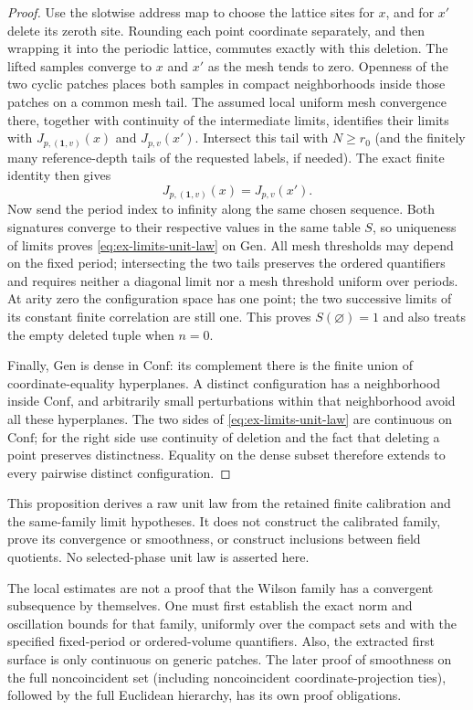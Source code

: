 \begin{proof}
Use the slotwise address map to choose the lattice sites for $x$, and
for $x'$ delete its zeroth site. Rounding each point coordinate separately,
and then wrapping it into the periodic lattice, commutes exactly with
this deletion. The lifted samples converge to $x$ and $x'$ as the mesh
tends to zero. Openness of the two cyclic patches places both samples in
compact neighborhoods inside those patches on a common mesh tail.
The assumed local uniform mesh convergence there, together with continuity
of the intermediate limits, identifies their limits with
$J_{p,(\mathbf1,v)}(x)$ and $J_{p,v}(x')$. Intersect this tail with
$N\ge r_0$ (and the finitely many reference-depth tails of the requested
labels, if needed). The exact finite identity then gives
\[
 J_{p,(\mathbf1,v)}(x)=J_{p,v}(x').
\]
Now send the period index to infinity along the same chosen sequence.
Both signatures converge to their respective values in the same table
$S$, so uniqueness of limits proves \eqref{eq:ex-limits-unit-law} on
$\mathrm{Gen}$. All mesh thresholds may depend on the fixed period;
intersecting the two tails preserves the ordered quantifiers and requires
neither a diagonal limit nor a mesh threshold uniform over periods.
At arity zero the configuration space has one point; the two successive
limits of its constant finite correlation are still one. This proves
$S(\varnothing)=1$ and also treats the empty deleted tuple when $n=0$.

Finally, $\mathrm{Gen}$ is dense in $\mathrm{Conf}$: its complement there
is the finite union of coordinate-equality hyperplanes. A distinct
configuration has a neighborhood inside $\mathrm{Conf}$, and arbitrarily
small perturbations within that neighborhood avoid all these hyperplanes.
The two sides of \eqref{eq:ex-limits-unit-law} are continuous on
$\mathrm{Conf}$; for the right side use continuity of deletion and the
fact that deleting a point preserves distinctness. Equality on the dense
subset therefore extends to every pairwise distinct configuration.
\end{proof}

This proposition derives a raw unit law from the retained finite calibration
and the same-family limit hypotheses. It does not construct the calibrated
family, prove its convergence or smoothness, or construct inclusions between
field quotients. No selected-phase unit law is asserted here.

\begin{remark}
\label{rem:ex-limits-scope}
The local estimates are not a proof that the Wilson family has a convergent
subsequence by themselves. One must first establish the exact norm and oscillation
bounds for that family, uniformly over the compact sets and with the specified
fixed-period or ordered-volume quantifiers. Also, the extracted first surface
is only continuous on generic patches. The later proof of smoothness on the
full noncoincident set (including noncoincident coordinate-projection ties),
followed by the full Euclidean hierarchy, has its own proof obligations.
\end{remark}


